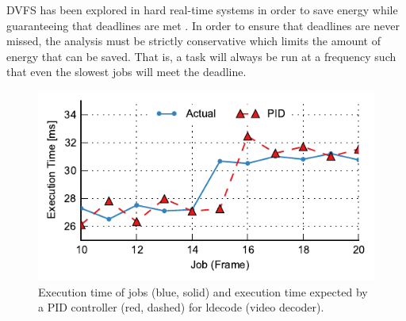DVFS has been explored in hard real-time systems in order to save energy while
guaranteeing that deadlines are met \cite{rtdvfs-systor12}. In order to ensure
that deadlines are never missed, the analysis must be strictly conservative
which limits the amount of energy that can be saved. That is, a task will
always be run at a frequency such that even the slowest jobs will meet the
deadline. 

\begin{figure}
  \begin{center}
    \includegraphics{exec_time_prediction/figs/ldecode_pid.pdf}
    \caption{Execution time of jobs (blue, solid) and execution time
    expected by a PID controller (red, dashed) for ldecode (video decoder).}
    \label{fig:applications.ldecode_pid}
  \end{center}
\end{figure}

